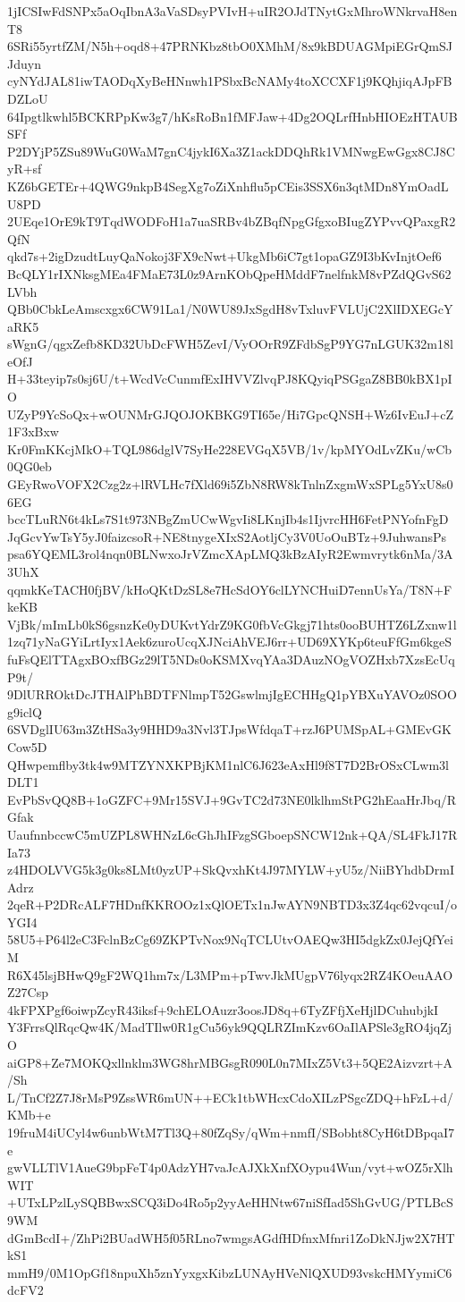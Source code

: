 1jICSIwFdSNPx5aOqIbnA3aVaSDsyPVIvH+uIR2OJdTNytGxMhroWNkrvaH8enT8
6SRi55yrtfZM/N5h+oqd8+47PRNKbz8tbO0XMhM/8x9kBDUAGMpiEGrQmSJJduyn
cyNYdJAL81iwTAODqXyBeHNnwh1PSbxBcNAMy4toXCCXF1j9KQhjiqAJpFBDZLoU
64Ipgtlkwhl5BCKRPpKw3g7/hKsRoBn1fMFJaw+4Dg2OQLrfHnbHIOEzHTAUBSFf
P2DYjP5ZSu89WuG0WaM7gnC4jykI6Xa3Z1ackDDQhRk1VMNwgEwGgx8CJ8CyR+sf
KZ6bGETEr+4QWG9nkpB4SegXg7oZiXnhflu5pCEis3SSX6n3qtMDn8YmOadLU8PD
2UEqe1OrE9kT9TqdWODFoH1a7uaSRBv4bZBqfNpgGfgxoBIugZYPvvQPaxgR2QfN
qkd7s+2igDzudtLuyQaNokoj3FX9cNwt+UkgMb6iC7gt1opaGZ9I3bKvInjtOef6
BcQLY1rIXNksgMEa4FMaE73L0z9ArnKObQpeHMddF7nelfnkM8vPZdQGvS62LVbh
QBb0CbkLeAmscxgx6CW91La1/N0WU89JxSgdH8vTxluvFVLUjC2XlIDXEGcYaRK5
sWgnG/qgxZefb8KD32UbDcFWH5ZevI/VyOOrR9ZFdbSgP9YG7nLGUK32m18leOfJ
H+33teyip7s0sj6U/t+WcdVcCunmfExIHVVZlvqPJ8KQyiqPSGgaZ8BB0kBX1pIO
UZyP9YcSoQx+wOUNMrGJQOJOKBKG9TI65e/Hi7GpcQNSH+Wz6IvEuJ+cZ1F3xBxw
Kr0FmKKcjMkO+TQL986dglV7SyHe228EVGqX5VB/1v/kpMYOdLvZKu/wCb0QG0eb
GEyRwoVOFX2Czg2z+lRVLHc7fXld69i5ZbN8RW8kTnlnZxgmWxSPLg5YxU8s06EG
bccTLuRN6t4kLs7S1t973NBgZmUCwWgvIi8LKnjIb4s1IjvrcHH6FetPNYofnFgD
JqGcvYwTsY5yJ0faizcsoR+NE8tnygeXIxS2AotljCy3V0UoOuBTz+9JuhwansPs
psa6YQEML3rol4nqn0BLNwxoJrVZmcXApLMQ3kBzAIyR2Ewmvrytk6nMa/3A3UhX
qqmkKeTACH0fjBV/kHoQKtDzSL8e7HcSdOY6clLYNCHuiD7ennUsYa/T8N+FkeKB
VjBk/mImLb0kS6gsnzKe0yDUKvtYdrZ9KG0fbVcGkgj71hts0ooBUHTZ6LZxnw1l
1zq71yNaGYiLrtIyx1Aek6zuroUcqXJNciAhVEJ6rr+UD69XYKp6teuFfGm6kgeS
fuFsQElTTAgxBOxfBGz29lT5NDs0oKSMXvqYAa3DAuzNOgVOZHxb7XzsEcUqP9t/
9DlURROktDcJTHAlPhBDTFNlmpT52GswlmjIgECHHgQ1pYBXuYAVOz0SOOg9iclQ
6SVDglIU63m3ZtHSa3y9HHD9a3Nvl3TJpsWfdqaT+rzJ6PUMSpAL+GMEvGKCow5D
QHwpemflby3tk4w9MTZYNXKPBjKM1nlC6J623eAxHl9f8T7D2BrOSxCLwm3lDLT1
EvPbSvQQ8B+1oGZFC+9Mr15SVJ+9GvTC2d73NE0lklhmStPG2hEaaHrJbq/RGfak
UaufnnbccwC5mUZPL8WHNzL6cGhJhIFzgSGboepSNCW12nk+QA/SL4FkJ17RIa73
z4HDOLVVG5k3g0ks8LMt0yzUP+SkQvxhKt4J97MYLW+yU5z/NiiBYhdbDrmIAdrz
2qeR+P2DRcALF7HDnfKKROOz1xQlOETx1nJwAYN9NBTD3x3Z4qc62vqcuI/oYGI4
58U5+P64l2eC3FclnBzCg69ZKPTvNox9NqTCLUtvOAEQw3HI5dgkZx0JejQfYeiM
R6X45lsjBHwQ9gF2WQ1hm7x/L3MPm+pTwvJkMUgpV76lyqx2RZ4KOeuAAOZ27Csp
4kFPXPgf6oiwpZcyR43iksf+9chELOAuzr3oosJD8q+6TyZFfjXeHjlDCuhubjkI
Y3FrrsQlRqcQw4K/MadTIlw0R1gCu56yk9QQLRZImKzv6OaIlAPSle3gRO4jqZjO
aiGP8+Ze7MOKQxllnklm3WG8hrMBGsgR090L0n7MIxZ5Vt3+5QE2Aizvzrt+A/Sh
L/TnCf2Z7J8rMsP9ZssWR6mUN++ECk1tbWHcxCdoXILzPSgcZDQ+hFzL+d/KMb+e
19fruM4iUCyl4w6unbWtM7Tl3Q+80fZqSy/qWm+nmfI/SBobht8CyH6tDBpqaI7e
gwVLLTlV1AueG9bpFeT4p0AdzYH7vaJcAJXkXnfXOypu4Wun/vyt+wOZ5rXlhWIT
+UTxLPzlLySQBBwxSCQ3iDo4Ro5p2yyAeHHNtw67niSfIad5ShGvUG/PTLBcS9WM
dGmBcdI+/ZhPi2BUadWH5f05RLno7wmgsAGdfHDfnxMfnri1ZoDkNJjw2X7HTkS1
mmH9/0M1OpGf18npuXh5znYyxgxKibzLUNAyHVeNlQXUD93vskcHMYymiC6dcFV2
